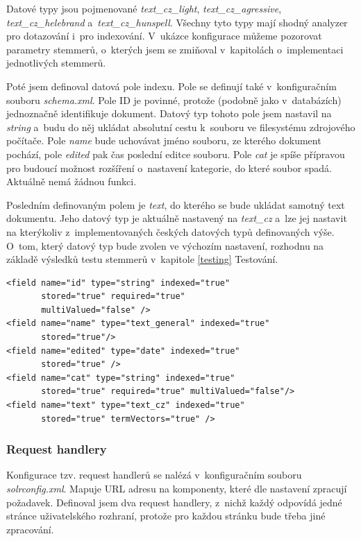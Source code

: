 Datové typy jsou pojmenované \emph{text\_cz\_light}, \emph{text\_cz\_agressive}, \emph{text\_cz\_helebrand} a~\emph{text\_cz\_hunspell}. Všechny tyto typy mají shodný analyzer pro dotazování i~pro indexování. V~ukázce konfigurace můžeme pozorovat parametry stemmerů, o~kterých jsem se zmiňoval v~kapitolách o~implementaci jednotlivých stemmerů.

Poté jsem definoval datová pole indexu. Pole se definují také v~konfiguračním souboru \emph{schema.xml}. Pole ID je povinné, protože (podobně jako v~databázích) jednoznačně identifikuje dokument. Datový typ tohoto pole jsem nastavil na \emph{string} a~budu do něj ukládat absolutní cestu k~souboru ve filesystému zdrojového počítače. Pole \emph{name} bude uchovávat jméno souboru, ze kterého dokument pochází, pole \emph{edited} pak čas poslední editce souboru. Pole \emph{cat} je spíše přípravou pro budoucí možnost rozšíření o~nastavení kategorie, do které soubor spadá. Aktuálně nemá žádnou funkci.

Posledním definovaným polem je \emph{text}, do kterého se bude ukládat samotný text dokumentu. Jeho datový typ je aktuálně nastavený na \emph{text\_cz} a~lze jej nastavit na kterýkoliv z~implementovaných českých datových typů definovaných výše. O~tom, který datový typ bude zvolen ve výchozím nastavení, rozhodnu na základě výsledků testu stemmerů v~kapitole \ref{testing} Testování. 

\begin{verbatim}
<field name="id" type="string" indexed="true" 
       stored="true" required="true" 
       multiValued="false" /> 
<field name="name" type="text_general" indexed="true" 
       stored="true"/>
<field name="edited" type="date" indexed="true" 
       stored="true" />
<field name="cat" type="string" indexed="true" 
       stored="true" required="true" multiValued="false"/>
<field name="text" type="text_cz" indexed="true" 
       stored="true" termVectors="true" />
\end{verbatim}

\subsubsection{Request handlery}
Konfigurace tzv. request handlerů se nalézá v~konfiguračním souboru \emph{solrconfig.xml}. Mapuje URL adresu na komponenty, které dle nastavení zpracují požadavek. Definoval jsem dva request handlery, z~nichž každý odpovídá jedné stránce uživatelského rozhraní, protože pro každou stránku bude třeba jiné zpracování. 

